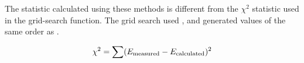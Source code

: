 \documentclass[12pt]{report}
\begin{document}
The statistic calculated using these methods is different from the $\chi^2$ statistic used in the grid-search function.  The grid search used , and generated values of the same order as .

\begin{equation}
\label{eq:chi2grid}
\chi^2=\sum (E_{\textnormal{measured}} - E_{\textnormal{calculated}})^2
\end{equation}

\newpage

\end{document}
